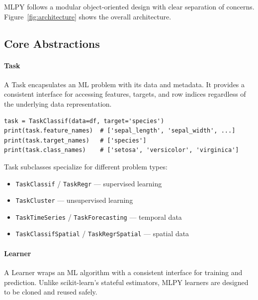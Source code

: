 \documentclass[twoside,11pt]{article}
\begin{document}
MLPY follows a modular object-oriented design with clear separation of concerns.
Figure~\ref{fig:architecture} shows the overall architecture.


\subsection{Core Abstractions}

\paragraph{Task}
A Task encapsulates an ML problem with its data and metadata. It provides a
consistent interface for accessing features, targets, and row indices regardless
of the underlying data representation.

\begin{lstlisting}
task = TaskClassif(data=df, target='species')
print(task.feature_names)  # ['sepal_length', 'sepal_width', ...]
print(task.target_names)   # ['species']
print(task.class_names)    # ['setosa', 'versicolor', 'virginica']
\end{lstlisting}

Task subclasses specialize for different problem types:
\begin{itemize}
  \item \texttt{TaskClassif} / \texttt{TaskRegr} --- supervised learning
  \item \texttt{TaskCluster} --- unsupervised learning
  \item \texttt{TaskTimeSeries} / \texttt{TaskForecasting} --- temporal data
  \item \texttt{TaskClassifSpatial} / \texttt{TaskRegrSpatial} --- spatial data
\end{itemize}

\paragraph{Learner}
A Learner wraps an ML algorithm with a consistent interface for training and
prediction. Unlike scikit-learn's stateful estimators, MLPY learners are
designed to be cloned and reused safely.
\end{document}
